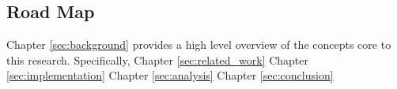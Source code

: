\subsection{Road Map}

Chapter \ref{sec:background} provides a high level overview of the concepts core to this research. Specifically, 
Chapter \ref{sec:related_work}
Chapter \ref{sec:implementation}
Chapter \ref{sec:analysis}
Chapter \ref{sec:conclusion}